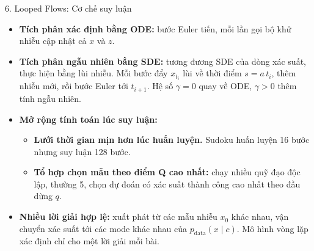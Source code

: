 \begin{frame}{6. Looped Flows: Cơ chế suy luận}
    \begin{itemize}
        \item \textbf{Tích phân xác định bằng ODE:} bước Euler tiến, mỗi lần gọi bộ khử nhiễu cập nhật cả $x$ và $z$.
        \item \textbf{Tích phân ngẫu nhiên bằng SDE:} tương đương SDE của dòng xác suất, thực hiện bằng lùi nhiễu. Mỗi bước đẩy $x_{t_i}$ lùi về thời điểm $s = a\,t_i$, thêm nhiễu mới, rồi bước Euler tới $t_{i+1}$. Hệ số $\gamma = 0$ quay về ODE, $\gamma > 0$ thêm tính ngẫu nhiên.
        \item \textbf{Mở rộng tính toán lúc suy luận:}
        \begin{itemize}
            \item \textbf{Lưới thời gian mịn hơn lúc huấn luyện.} Sudoku huấn luyện 16 bước nhưng suy luận 128 bước.
            \item \textbf{Tổ hợp chọn mẫu theo điểm Q cao nhất:} chạy nhiều quỹ đạo độc lập, thường 5, chọn dự đoán có xác suất thành công cao nhất theo đầu dừng $q$.
        \end{itemize}
        \item \textbf{Nhiều lời giải hợp lệ:} xuất phát từ các mẫu nhiễu $x_0$ khác nhau, vận chuyển xác suất tới các mode khác nhau của $p_{\text{data}}(x \mid c)$. Mô hình vòng lặp xác định chỉ cho một lời giải mỗi bài.
    \end{itemize}
\end{frame}

